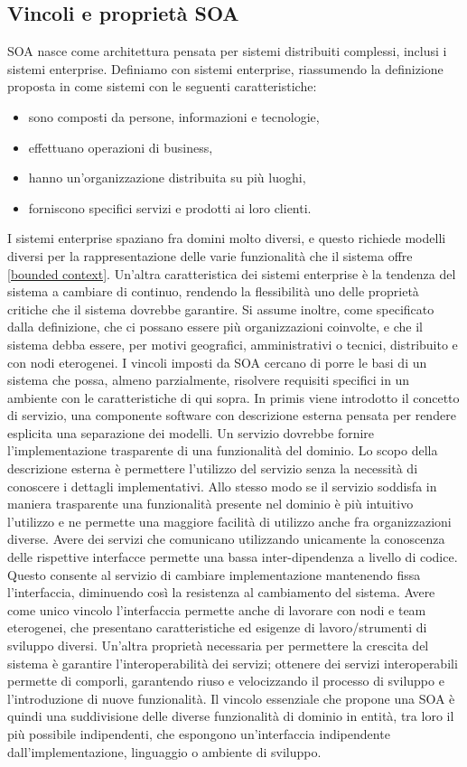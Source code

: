 \documentclass[a4paper,12pt]{report}
\begin{document}
\subsection{Vincoli e proprietà SOA}
SOA nasce come architettura pensata per sistemi distribuiti complessi, inclusi i sistemi enterprise.
Definiamo con sistemi enterprise, riassumendo la definizione proposta in \cite{eneterpiseSysRood} come sistemi con le seguenti caratteristiche:
\begin{itemize}
    \item sono composti da persone, informazioni e tecnologie,
    \item effettuano operazioni di business,
    \item hanno un'organizzazione distribuita su più luoghi,
    \item forniscono specifici servizi e prodotti ai loro clienti.
\end{itemize}
I sistemi enterprise spaziano fra domini molto diversi, e questo richiede modelli diversi per la rappresentazione delle varie funzionalità che il sistema offre \ref{bounded context}.
Un'altra caratteristica dei sistemi enterprise è la tendenza del sistema a cambiare di continuo, rendendo la flessibilità uno delle proprietà critiche che il sistema dovrebbe garantire.
Si assume inoltre, come specificato dalla definizione, che ci possano essere più organizzazioni coinvolte, e che il sistema debba essere, per motivi geografici, amministrativi o tecnici, distribuito e con nodi eterogenei.
I vincoli imposti da SOA cercano di porre le basi di un sistema che possa, almeno parzialmente, risolvere requisiti specifici in un ambiente con le caratteristiche di qui sopra.
In primis viene introdotto il concetto di servizio, una componente software con descrizione esterna pensata per rendere esplicita una separazione dei modelli.
Un servizio dovrebbe fornire l'implementazione trasparente di una funzionalità del dominio.
Lo scopo della descrizione esterna è permettere l'utilizzo del servizio senza la necessità di conoscere i dettagli implementativi.
Allo stesso modo se il servizio soddisfa in maniera trasparente una funzionalità presente nel dominio è più intuitivo l'utilizzo e ne permette una maggiore facilità di utilizzo anche fra organizzazioni diverse.  
Avere dei servizi che comunicano utilizzando unicamente la conoscenza delle rispettive interfacce permette una bassa inter-dipendenza a livello di codice.
Questo consente al servizio di cambiare implementazione mantenendo fissa l'interfaccia, diminuendo così la resistenza al cambiamento del sistema.
Avere come unico vincolo l'interfaccia permette anche di lavorare con nodi e team eterogenei, che presentano caratteristiche ed esigenze di lavoro/strumenti di sviluppo diversi.
Un'altra proprietà necessaria per permettere la crescita del sistema è garantire l'interoperabilità dei servizi; ottenere dei servizi interoperabili permette di comporli, garantendo riuso e velocizzando il processo di sviluppo e l'introduzione di nuove funzionalità. 
Il vincolo essenziale che propone una SOA è quindi una suddivisione delle diverse funzionalità di dominio in entità, tra loro il più possibile indipendenti, che espongono un'interfaccia indipendente dall'implementazione, linguaggio o ambiente di sviluppo. 
\end{document}
